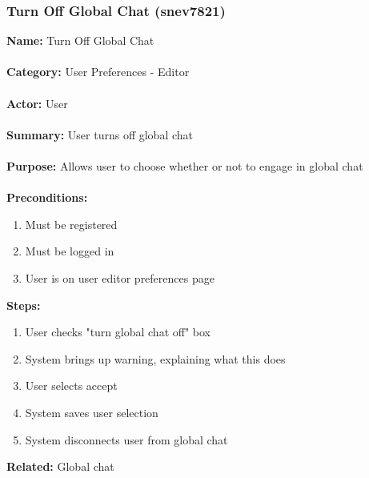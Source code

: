 \documentclass[11pt]{report}
\begin{document}
\subsubsection{Turn Off Global Chat (snev7821)}
\begin{framed}
	\noindent\textbf{Name:} Turn Off Global Chat \\ \\
	\textbf{Category:} User Preferences - Editor  \\ \\
	\textbf{Actor:} User \\ \\
	\textbf{Summary:} User turns off global chat \\ \\
	\textbf{Purpose:} Allows user to choose whether or not to engage in global chat \\ \\
	\textbf{Preconditions:} 
	\begin{enumerate}
		\item Must be registered
		\item Must be logged in
		\item User is on user editor preferences page
	\end{enumerate}
	\textbf{Steps:}
	\begin{enumerate}
		\item User checks "turn global chat off" box
		\item System brings up warning, explaining what this does
		\item User selects accept
		\item System saves user selection
		\item System disconnects user from global chat
	\end{enumerate}
	\textbf{Related:} Global chat
\end{framed}

\newpage
\end{document}
